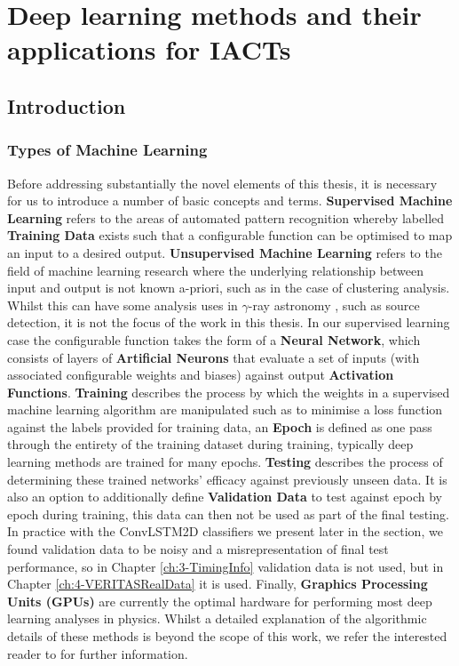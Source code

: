 \chapter{\label{ch:2-CNNs}Deep learning methods and their applications for IACTs}
\minitoc
\section{Introduction}

\subsection{Types of Machine Learning}
Before addressing substantially the novel elements of this thesis, it is necessary for us to introduce a number of basic 
concepts and terms. \textbf{Supervised Machine Learning} refers to the areas of automated pattern recognition whereby labelled \textbf{Training Data} exists such that a configurable function can be optimised to map an input to a desired output. \textbf{Unsupervised Machine Learning} refers to the field of machine learning research where the underlying relationship between input and output is not known a-priori, such as in the case of clustering analysis. Whilst this can have some analysis uses in $\gamma$-ray astronomy \cite{tomthesis}, such as source detection, it is not the focus of the work in this thesis. In our supervised learning case the configurable function takes the form of a \textbf{Neural Network}, which consists of layers of \textbf{Artificial Neurons} that evaluate a set of inputs (with associated configurable weights and biases) against output \textbf{Activation Functions}. \textbf{Training} describes the process by which the weights in a supervised machine learning algorithm are manipulated such as to minimise a loss function against the labels provided for training data, an \textbf{Epoch} is defined as one pass through the entirety of the training dataset during training, typically deep learning methods are trained for many epochs. \textbf{Testing} describes the process of determining these trained networks' efficacy against previously unseen data. It is also an option to additionally define \textbf{Validation Data} to test against epoch by epoch during training, this data can then not be used as part of the final testing. In practice with the ConvLSTM2D classifiers we present later in the section, we found validation data to be noisy and a misrepresentation of final test performance, so in Chapter \ref{ch:3-TimingInfo} validation data is not used, but in Chapter \ref{ch:4-VERITASRealData} it is used. Finally, \textbf{Graphics Processing Units (GPUs)} are currently the optimal hardware for performing most deep learning analyses in physics. Whilst a detailed explanation of the algorithmic details of these methods is beyond the scope of this work, we refer the interested reader to \cite{goodfellow2016deep} \cite{erdmannwhite} \cite{dcnn} for further information.

